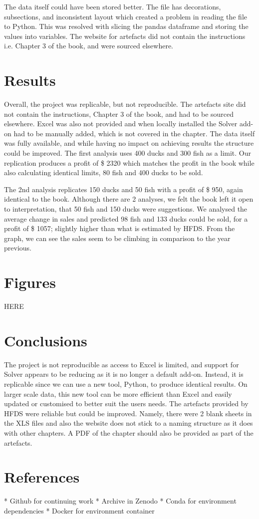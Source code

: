 \documentclass[acmtog]{acmart}
\begin{document}
The data itself could have been stored better. The file has decorations, subsections, and inconsistent layout which created a problem in reading the file to Python. This was resolved with slicing the pandas dataframe and storing the values into variables. The website for artefacts did not contain the instructions i.e. Chapter 3 of the book, and were sourced elsewhere. 

\section{Results}
Overall, the project was replicable, but not reproducible. The artefacts site did not contain the instructions, Chapter 3 of the book, and had to be sourced elsewhere. Excel was also not provided and when locally installed the Solver add-on had to be manually added, which is not covered in the chapter. The data itself was fully available, and while having no impact on achieving results the structure could be improved. The first analysis uses 400 ducks and 300 fish as a limit. Our replication produces a profit of \$ 2320 which matches the profit in the book while also calculating identical limits, 80 fish and 400 ducks to be sold. 

The 2nd analysis replicates 150 ducks and 50 fish with a profit of \$ 950, again identical to the book. Although there are 2 analyses, we felt the book left it open to interpretation, that 50 fish and 150 ducks were suggestions. We analysed the average change in sales and predicted 98 fish and 133 ducks could be sold, for a profit of \$ 1057; slightly higher than what is estimated by HFDS. From the graph, we can see the sales seem to be climbing in comparison to the year previous.

\section{Figures}
HERE

\section{Conclusions}
The project is not reproducible as access to Excel is limited, and support for Solver appears to be reducing as it is no longer a default add-on. Instead, it is replicable since we can use a new tool, Python, to produce identical results. On larger scale data, this new tool can be more efficient than Excel and easily updated or customised to better suit the users needs. The artefacts provided by HFDS were  reliable but could be improved. Namely, there were 2 blank sheets in the XLS files and also the website does not stick to a naming structure as it does with other chapters. A PDF of the chapter should also be provided as part of the artefacts.



\section{References}

* Github for continuing work
* Archive in Zenodo
* Conda for environment dependencies
* Docker for environment container
\end{document}
